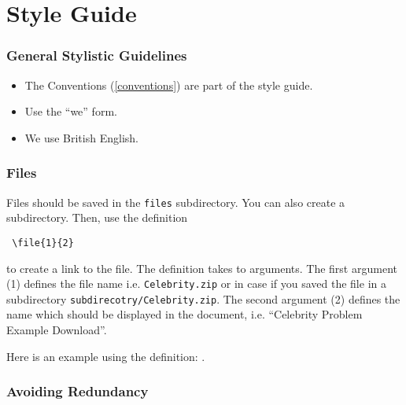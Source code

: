 \section{Style Guide}


\subsubsection{General Stylistic Guidelines}

\begin{itemize}
	\item The Conventions (\ref{conventions}) are part of the style guide.

	\item Use the ``we'' form.

	\item We use British English.
\end{itemize}

\subsubsection{Files}

Files should be saved in the \texttt{files} subdirectory. You can also create a subdirectory. Then, use the definition 

\begin{verbatim} \file{1}{2} \end{verbatim} 

to create a link to the file. The definition takes to arguments. The first argument (1) defines the file name i.e. \texttt{Celebrity.zip} or in case if you saved the file in a subdirectory \texttt{subdirecotry/Celebrity.zip}. The second argument (2) defines the name which should be displayed in the document, i.e. ``Celebrity Problem Example Download''.


Here is an example using the definition: .

\subsubsection{Avoiding Redundancy}


